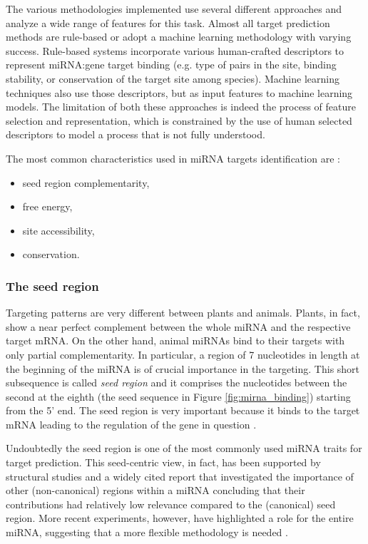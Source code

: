 The various methodologies implemented use several different approaches and analyze a wide range of features for this task. Almost all target prediction methods are rule-based or adopt a machine learning methodology with varying success. Rule-based systems incorporate various human-crafted descriptors to represent miRNA:gene target binding (e.g. type of pairs in the site, binding stability, or conservation of the target site among species). Machine learning techniques also use those descriptors, but as input features to machine learning models. The limitation of both these approaches is indeed the process of feature selection and representation, which is constrained by
the use of human selected descriptors to model a process that is not fully understood.

The most common characteristics used in miRNA targets identification are \cite{common_features}:
\begin{itemize}
	\item seed region complementarity,
	\item free energy,
	\item site accessibility,
	\item conservation.
\end{itemize}

\subsubsection{The seed region}
Targeting patterns are very different between plants and animals. Plants, in fact, show a near perfect complement between the whole miRNA and the respective target mRNA. On the other hand, animal miRNAs bind to their targets with only partial complementarity. In particular, a region of 7 nucleotides in length at the beginning of the miRNA is of crucial importance in the targeting.  This short subsequence is called \emph{seed region} and it comprises the nucleotides between the second at the eighth (the seed sequence in Figure \ref{fig:mirna_binding}) starting from the 5' end. 
The seed region is very important because it binds to the target mRNA leading to the regulation of the gene in question \cite{mirna_overview}.

Undoubtedly the seed region is one of the most commonly used miRNA traits for target prediction. This seed-centric view, in fact,  has been supported by structural studies \cite{structural_basis} and a widely cited report  \cite{canonical_target} that investigated the importance of other (non-canonical) regions within a miRNA concluding that their contributions had relatively low relevance compared to the (canonical)
seed region. More recent experiments, however, have highlighted a role for the entire miRNA, suggesting that a more flexible methodology is needed \cite{helwak}.

